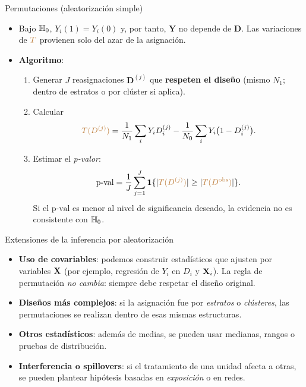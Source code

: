 \documentclass[10pt, xcolor=dvipsnames]{beamer}
\begin{document}
\begin{frame}{Permutaciones (aleatorización simple)}
\begin{itemize}
    \item Bajo \(\textcolor{black}{\mathbb{H}_{0}}\), \(Y_i(1)=Y_i(0)\) y, por tanto, \(\mathbf{Y}\) no depende de \(\mathbf{D}\). Las variaciones de \(\textcolor{brown}{T}\) provienen solo del azar de la asignación. 
    \vspace{1em}
    \item \textbf{Algoritmo}: 
    \begin{enumerate}
        \item Generar \(J\) reasignaciones \(\mathbf{D}^{(j)}\) que \textbf{respeten el diseño} (mismo \(N_1\); dentro de estratos o por clúster si aplica). 
        \vspace{1em}
        \item Calcular
        \vspace{-1.0em}
    \[
        \textcolor{brown}{T({D^{(j)}})}=\frac{1}{N_1}\sum_i Y_i D_i^{(j)}-\frac{1}{N_0}\sum_i Y_i\big(1-D_i^{(j)}\big).
    \]
        \item Estimar el \textit{p-valor}:
        \vspace{-1.0em}
    \[
        \text{p-val}=\frac{1}{J}\sum_{j=1}^{J}\mathbf{1} \{ |\textcolor{brown}{T({D^{(j)}})}| \ge | \textcolor{brown}{T({D^\text{obs}})}| \}.
    \]
    Si el \(\text{p-val}\) es menor al nivel de significancia deseado, la evidencia no es consistente con \(\textcolor{black}{\mathbb{H}_{0}}\).
    \end{enumerate} 
\end{itemize}
\end{frame}


\begin{frame}{Extensiones de la inferencia por aleatorización}
\begin{itemize}
  \item \textbf{Uso de covariables}: podemos construir estadísticos que ajusten por variables \(\textbf{X}\) (por ejemplo, regresión de \(Y_i\) en \(D_i\) y \(\textbf{X}_i\)).  
  La regla de permutación \emph{no cambia}: siempre debe respetar el diseño original. %
  \vspace{1em}
  \item \textbf{Diseños más complejos}: si la asignación fue por \emph{estratos} o \emph{clústeres}, las permutaciones se realizan dentro de esas mismas estructuras. %
  \vspace{1em}
  \item \textbf{Otros estadísticos}: además de medias, se pueden usar medianas, rangos o pruebas de distribución. %
  \vspace{1em}
  \item \textbf{Interferencia o spillovers}: si el tratamiento de una unidad afecta a otras, se pueden plantear hipótesis basadas en \emph{exposición} o en redes.
\end{itemize}
\end{frame}
\end{document}
